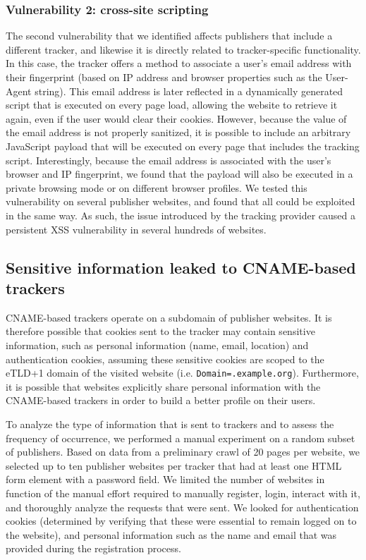 \subsubsection{Vulnerability 2: cross-site scripting} The second vulnerability that we identified affects publishers that include a different tracker, and likewise it is directly related to tracker-specific functionality.
In this case, the tracker offers a method to associate a user's email address with their fingerprint (based on IP address and browser properties such as the User-Agent string).
This email address is later reflected in a dynamically generated script that is executed on every page load, allowing the website to retrieve it again, even if the user would clear their cookies.
However, because the value of the email address is not properly sanitized, it is possible to include an arbitrary JavaScript payload that will be executed on every page that includes the tracking script.
Interestingly, because the email address is associated with the user's browser and IP fingerprint, we found that the payload will also be executed in a private browsing mode or on different browser profiles.
We tested this vulnerability on several publisher websites, and found that all could be exploited in the same way.
As such, the issue introduced by the tracking provider caused a persistent XSS vulnerability in several hundreds of websites.

\subsection{Sensitive information leaked to CNAME-based trackers}
\label{sec:privacy-implications}
CNAME-based trackers operate on a subdomain of publisher websites.
It is therefore possible that cookies sent to the tracker may contain sensitive information, such as personal information (name, email, location) and authentication cookies, assuming these sensitive cookies are scoped to the eTLD+1 domain of the visited website (i.e. \texttt{Domain=.example.org}).
Furthermore, it is possible that websites explicitly share personal information with the CNAME-based trackers in order to build a better profile on their users.

To analyze the type of information that is sent to trackers and to assess the frequency of occurrence, we performed a manual experiment on a random subset of publishers.
Based on data from a preliminary crawl of 20 pages per website, we selected up to ten publisher websites per tracker that had at least one HTML form element with a password field.
We limited the number of websites in function of the manual effort required to manually register, login, interact with it, and thoroughly analyze the requests that were sent.
We looked for authentication cookies (determined by verifying that these were essential to remain logged on to the website), and personal information such as the name and email that was provided during the registration process.

